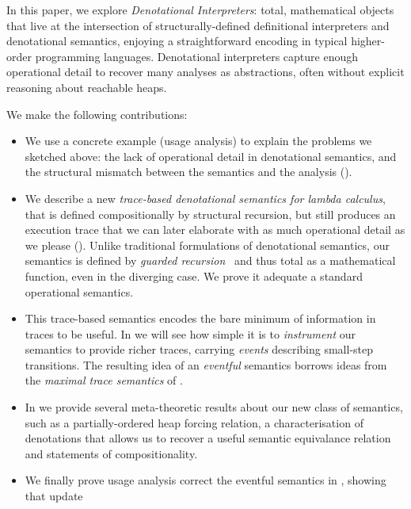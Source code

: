 In this paper, we explore \emph{Denotational Interpreters}:
total, mathematical objects that live at the intersection of
structurally-defined definitional interpreters and denotational semantics,
enjoying a straightforward encoding in typical higher-order programming
languages.
Denotational interpreters capture enough operational detail to recover many
analyses as abstractions, often without explicit reasoning about reachable heaps.

We make the following contributions:
\begin{itemize}
\item We use a concrete example (usage analysis) to explain the problems we sketched
  above: the lack of operational detail in denotational semantics, and the structural mismatch
  between the semantics and the analysis ().
\item We describe a new \emph{trace-based denotational semantics for lambda calculus},
  that is defined compositionally by structural recursion, but still produces an execution
  trace that we can later elaborate with as much operational detail as we please ().
  Unlike traditional formulations of denotational semantics, our semantics
  is defined by \emph{guarded recursion}~\citep{gdtt} and thus total as a
  mathematical function, even in the diverging case.
  We prove it adequate \wrt a standard operational semantics.
\item This trace-based semantics encodes the bare minimum of information in traces to be useful.
  In  we will see how simple it is to \emph{instrument} our
  semantics to provide richer traces, carrying \emph{events} describing
  small-step transitions.
  The resulting idea of an \emph{eventful} semantics borrows ideas from the
  \emph{maximal trace semantics} of \citet{Cousot:21}.
\item In  we provide several meta-theoretic results about our
  new class of semantics, such as a partially-ordered heap forcing relation,
  a characterisation of denotations that allows us to recover a useful
  semantic equivalance relation and statements of compositionality.
\item We finally prove usage analysis correct \wrt the
  eventful semantics in , showing that update

\end{itemize}
